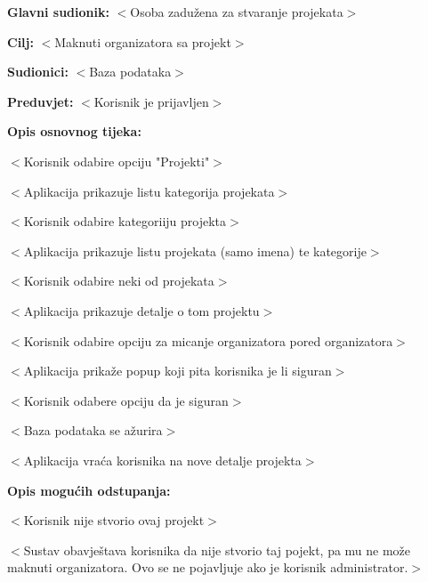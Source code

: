 					\noindent {}
					\begin{packed_item}

						\item \textbf{Glavni sudionik: }$<$Osoba zadužena za stvaranje projekata$>$
						\item  \textbf{Cilj:} $<$Maknuti organizatora sa projekt$>$
						\item  \textbf{Sudionici:} $<$Baza podataka$>$
						\item  \textbf{Preduvjet:} $<$Korisnik je prijavljen$>$
						\item  \textbf{Opis osnovnog tijeka:}

						\item[] \begin{packed_enum}

							\item $<$Korisnik odabire opciju "Projekti"$>$
							\item $<$Aplikacija prikazuje listu kategorija projekata$>$
							\item $<$Korisnik odabire kategoriiju projekta$>$
							\item $<$Aplikacija prikazuje listu projekata (samo imena) te kategorije$>$
							\item $<$Korisnik odabire neki od projekata$>$
							\item $<$Aplikacija prikazuje detalje o tom projektu$>$
							\item $<$Korisnik odabire opciju za micanje organizatora pored organizatora$>$
							\item $<$Aplikacija prikaže popup koji pita korisnika je li siguran$>$
							\item $<$Korisnik odabere opciju da je siguran$>$
							\item $<$Baza podataka se ažurira$>$
							\item $<$Aplikacija vraća korisnika na nove detalje projekta$>$
						\end{packed_enum}

						\item  \textbf{Opis mogućih odstupanja:}

						\item[] \begin{packed_item}

							\item[7.a] $<$Korisnik nije stvorio ovaj projekt$>$
							\item[] \begin{packed_enum}

								\item $<$Sustav obavještava korisnika da nije stvorio taj pojekt, pa mu ne može maknuti organizatora.
								Ovo se ne pojavljuje ako je korisnik administrator.$>$

							\end{packed_enum}

						\end{packed_item}
					\end{packed_item}

